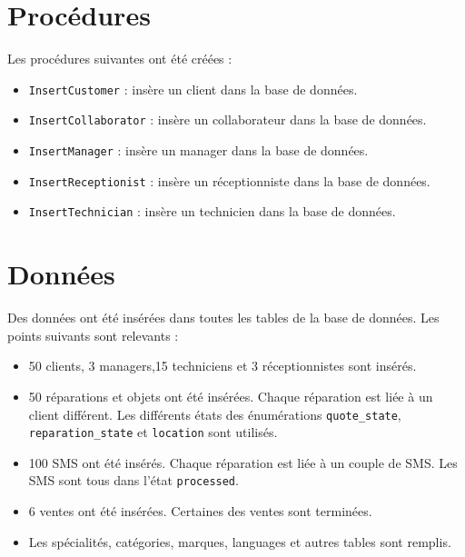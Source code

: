 \documentclass{article}
\newcommand{\ttt}{\texttt}
\begin{document}
    \section{Procédures}

    Les procédures suivantes ont été créées :
    \begin{itemize}
        \item \ttt{InsertCustomer} : insère un client dans la base de données.
        \item \ttt{InsertCollaborator} : insère un collaborateur dans la base de données.
        \item \ttt{InsertManager} : insère un manager dans la base de données.
        \item \ttt{InsertReceptionist} : insère un réceptionniste dans la base de données.
        \item \ttt{InsertTechnician} : insère un technicien dans la base de données.
    \end{itemize}


    \section{Données}

    Des données ont été insérées dans toutes les tables de la base de données. Les points suivants sont relevants :
    \begin{itemize}
        \item 50 clients, 3 managers,15 techniciens et 3 réceptionnistes sont insérés.
        \item 50 réparations et objets ont été insérées. Chaque réparation est liée à un client différent. Les différents états des énumérations \ttt{quote\_state}, \ttt{reparation\_state} et \ttt{location} sont utilisés.
        \item 100 SMS ont été insérés. Chaque réparation est liée à un couple de SMS. Les SMS sont tous dans l'état \ttt{processed}.
        \item 6 ventes ont été insérées. Certaines des ventes sont terminées.
        \item Les spécialités, catégories, marques, languages et autres tables sont remplis.
    \end{itemize}
\end{document}
